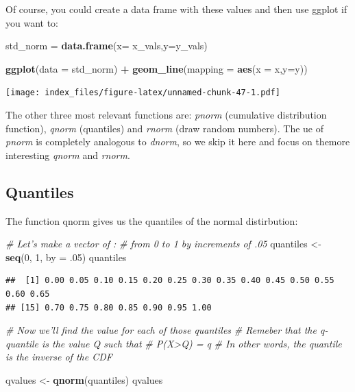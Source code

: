 \documentclass[]{article}
\newenvironment{Shaded}{\begin{snugshade}}{\end{snugshade}}
\newcommand{\CommentTok}[1]{\textcolor[rgb]{0.56,0.35,0.01}{\textit{#1}}}
\newcommand{\DataTypeTok}[1]{\textcolor[rgb]{0.13,0.29,0.53}{#1}}
\newcommand{\DecValTok}[1]{\textcolor[rgb]{0.00,0.00,0.81}{#1}}
\newcommand{\FloatTok}[1]{\textcolor[rgb]{0.00,0.00,0.81}{#1}}
\newcommand{\KeywordTok}[1]{\textcolor[rgb]{0.13,0.29,0.53}{\textbf{#1}}}
\newcommand{\NormalTok}[1]{#1}
\newcommand{\OperatorTok}[1]{\textcolor[rgb]{0.81,0.36,0.00}{\textbf{#1}}}
\newcommand{\StringTok}[1]{\textcolor[rgb]{0.31,0.60,0.02}{#1}}
\begin{document}
Of course, you could create a data frame with these values and then use
ggplot if you want to:

\begin{Shaded}
\begin{Highlighting}[]
\NormalTok{std_norm =}\StringTok{ }\KeywordTok{data.frame}\NormalTok{(}\DataTypeTok{x=}\NormalTok{ x_vals,}\DataTypeTok{y=}\NormalTok{y_vals)}

\KeywordTok{ggplot}\NormalTok{(}\DataTypeTok{data =}\NormalTok{ std_norm) }\OperatorTok{+}
\StringTok{  }\KeywordTok{geom_line}\NormalTok{(}\DataTypeTok{mapping =} \KeywordTok{aes}\NormalTok{(}\DataTypeTok{x =}\NormalTok{ x,}\DataTypeTok{y=}\NormalTok{y))}
\end{Highlighting}
\end{Shaded}

\texttt{[image: index\_files/figure-latex/unnamed-chunk-47-1.pdf]}

The other three most relevant functions are: \emph{pnorm} (cumulative
distribution function), \emph{qnorm} (quantiles) and \emph{rnorm} (draw
random numbers). The ue of \emph{pnorm} is completely analogous to
\emph{dnorm}, so we skip it here and focus on themore interesting
\emph{qnorm} and \emph{rnorm}.

\hypertarget{quantiles}{%
\subsection{Quantiles}\label{quantiles}}

The function qnorm gives us the quantiles of the normal distirbution:

\begin{Shaded}
\begin{Highlighting}[]
\CommentTok{# Let's make a vector of : }
\CommentTok{# from 0 to 1 by increments of .05}
\NormalTok{quantiles <-}\StringTok{ }\KeywordTok{seq}\NormalTok{(}\DecValTok{0}\NormalTok{, }\DecValTok{1}\NormalTok{, }\DataTypeTok{by =} \FloatTok{.05}\NormalTok{)}
\NormalTok{quantiles}
\end{Highlighting}
\end{Shaded}

\begin{verbatim}
##  [1] 0.00 0.05 0.10 0.15 0.20 0.25 0.30 0.35 0.40 0.45 0.50 0.55 0.60 0.65
## [15] 0.70 0.75 0.80 0.85 0.90 0.95 1.00
\end{verbatim}

\begin{Shaded}
\begin{Highlighting}[]
\CommentTok{# Now we'll find the value for each of those quantiles}
\CommentTok{# Remeber that the q-quantile is the value Q such that}
\CommentTok{# P(X>Q) = q }
\CommentTok{# In other words, the quantile is the inverse of the CDF}

\NormalTok{qvalues <-}\StringTok{ }\KeywordTok{qnorm}\NormalTok{(quantiles)}
\NormalTok{qvalues}
\end{Highlighting}
\end{Shaded}
\end{document}
